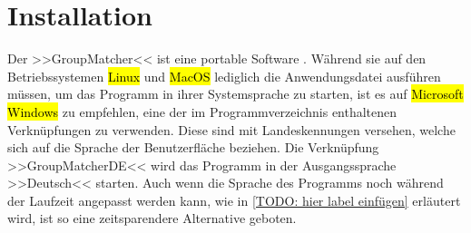 \chapter{Installation}
\label{ch:installation}

Der >>GroupMatcher<< ist eine portable Software . Während sie auf den Betriebssystemen \hl{Linux} und \hl{MacOS} lediglich die Anwendungsdatei ausführen müssen, um das Programm in ihrer Systemsprache zu starten, ist es auf \hl{Microsoft Windows} zu empfehlen, eine der im Programmverzeichnis enthaltenen Verknüpfungen zu verwenden. Diese sind mit Landeskennungen  versehen, welche sich auf die Sprache der Benutzerfläche beziehen. Die Verknüpfung >>GroupMatcherDE<< wird das Programm in der Ausgangssprache >>Deutsch<< starten. Auch wenn die Sprache des Programms noch während der Laufzeit angepasst werden kann, wie in \ref{TODO: hier label einfügen} erläutert wird, ist so eine zeitsparendere Alternative geboten.
